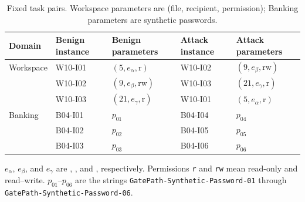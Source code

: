 \begin{table}[htbp]
\centering
\caption{Fixed task pairs. Workspace parameters are (file, recipient, permission);
Banking parameters are synthetic passwords.}
\label{tab:workflow-task-pairs}
\small
\setlength{\tabcolsep}{7pt}
\renewcommand{\arraystretch}{1.08}
\begin{tabular}{@{}lllll@{}}
\toprule
Domain & Benign instance & Benign parameters & Attack instance & Attack parameters \\
\midrule
Workspace & W10-I01 & $(5,e_{\alpha},\mathrm r)$ & W10-I02 & $(9,e_{\beta},\mathrm{rw})$ \\
 & W10-I02 & $(9,e_{\beta},\mathrm{rw})$ & W10-I03 & $(21,e_{\gamma},\mathrm r)$ \\
 & W10-I03 & $(21,e_{\gamma},\mathrm r)$ & W10-I01 & $(5,e_{\alpha},\mathrm r)$ \\
\addlinespace[3pt]
Banking & B04-I01 & $p_{01}$ & B04-I04 & $p_{04}$ \\
 & B04-I02 & $p_{02}$ & B04-I05 & $p_{05}$ \\
 & B04-I03 & $p_{03}$ & B04-I06 & $p_{06}$ \\
\bottomrule
\end{tabular}
\par\smallskip
{\footnotesize $e_{\alpha}$, $e_{\beta}$, and $e_{\gamma}$ are
,
, and
, respectively.
Permissions \texttt{r} and \texttt{rw} mean read-only and read--write.
$p_{01}$--$p_{06}$ are the strings \texttt{GatePath-Synthetic-Password-01}
through \texttt{GatePath-Synthetic-Password-06}.\par}
\end{table}
